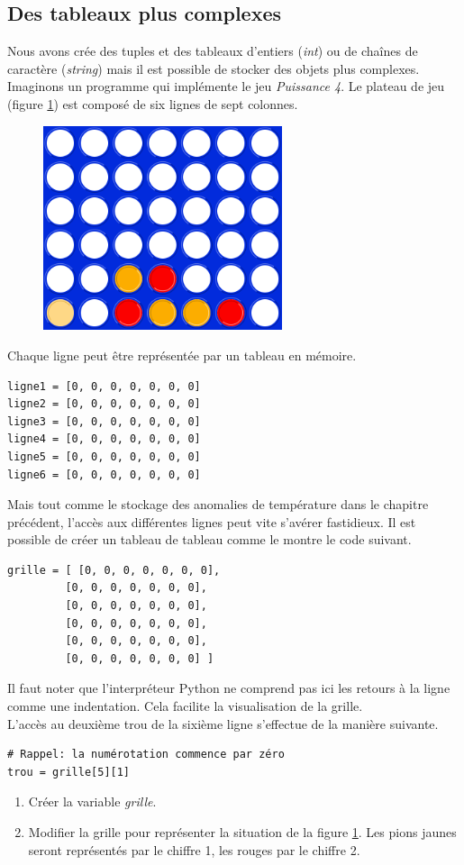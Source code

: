 \documentclass[a4paper,11pt]{article}
\begin{document}
\begin{Form}
\section{Des tableaux plus complexes}
Nous avons crée des tuples et des tableaux d'entiers (\emph{int}) ou de chaînes de caractère (\emph{string}) mais il est possible de stocker des objets plus complexes. Imaginons un programme qui implémente le jeu \emph{Puissance 4}. Le plateau de jeu (figure \ref{puissance4}) est composé de six lignes de sept colonnes.
\begin{figure}[!h]
\centering
\includegraphics[width=7cm]{ressources/puissance4.png}
\label{puissance4}
\end{figure}

Chaque ligne peut être représentée par un tableau en mémoire.
\begin{lstlisting}
ligne1 = [0, 0, 0, 0, 0, 0, 0]
ligne2 = [0, 0, 0, 0, 0, 0, 0]
ligne3 = [0, 0, 0, 0, 0, 0, 0]
ligne4 = [0, 0, 0, 0, 0, 0, 0]
ligne5 = [0, 0, 0, 0, 0, 0, 0]
ligne6 = [0, 0, 0, 0, 0, 0, 0]
\end{lstlisting}
Mais tout comme le stockage des anomalies de température dans le chapitre précédent, l'accès aux différentes lignes peut vite s'avérer fastidieux. Il est possible de créer un tableau de tableau comme le montre le code suivant.
\begin{lstlisting}
grille = [ [0, 0, 0, 0, 0, 0, 0],
 	     [0, 0, 0, 0, 0, 0, 0],
 	     [0, 0, 0, 0, 0, 0, 0],
 	     [0, 0, 0, 0, 0, 0, 0],
 	     [0, 0, 0, 0, 0, 0, 0],
 	     [0, 0, 0, 0, 0, 0, 0] ]
\end{lstlisting}
Il faut noter que l'interpréteur Python ne comprend pas ici les retours à la ligne comme une indentation. Cela facilite la visualisation de la grille.\\
L'accès au deuxième trou de la sixième ligne s'effectue de la manière suivante.
\begin{lstlisting}
# Rappel: la numérotation commence par zéro
trou = grille[5][1]
\end{lstlisting}
\begin{activite}
\begin{enumerate}
\item Créer la variable \emph{grille}.
\item Modifier la grille pour représenter la situation de la figure \ref{puissance4}. Les pions jaunes seront représentés par le chiffre 1, les rouges par le chiffre 2.
\end{enumerate}
\end{activite}
\end{Form}
\end{document}
